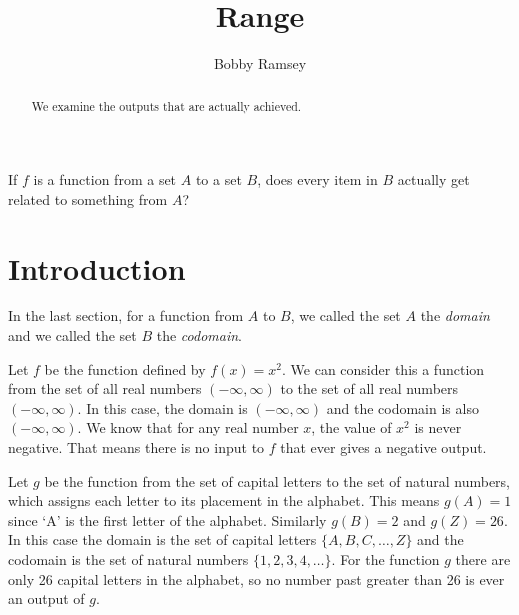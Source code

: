 \documentclass[nooutcomes]{ximera}
\author{Bobby Ramsey}
\title{Range}
\begin{document}
\begin{abstract}
 	We examine the outputs that are actually achieved.
\end{abstract}
\maketitle



\begin{motivatingQuestions}
	\item If $f$ is a function from a set $A$ to a set $B$, does every item in $B$ actually get related to something from $A$?
\end{motivatingQuestions}

\section{Introduction}

	In the last section, for a function from $A$ to $B$,  we called the set $A$ the \emph{domain} and we called the set $B$ the \emph{codomain}.
	
	Let $f$ be the function defined by $f(x) = x^2$. We can consider this a function from the set of all real numbers $(-\infty, \infty)$ to the set of all 
	real numbers $(-\infty, \infty)$. In this case, the domain is $(-\infty, \infty)$ and the codomain is also $(-\infty, \infty)$.
	We know that for any real number $x$, the value of $x^2$ is never negative. That means there is no input to $f$ that ever gives a negative output.
		
	Let $g$ be the function from the set of capital letters to the set of natural numbers, which assigns each letter to its placement in the alphabet. 
	This means $g(A)=1$ since `A' is the first letter of the alphabet. Similarly $g(B) = 2$ and $g(Z)=26$. In this case the domain is the set of capital
	letters $\{ A, B, C, \ldots, Z\}$ and the codomain is the set of natural numbers $\{1, 2, 3, 4, \ldots \}$. For the function $g$
	there are only 26 capital letters in the alphabet, so no number past greater than 26 is ever an output of $g$.  
	
\end{document}
